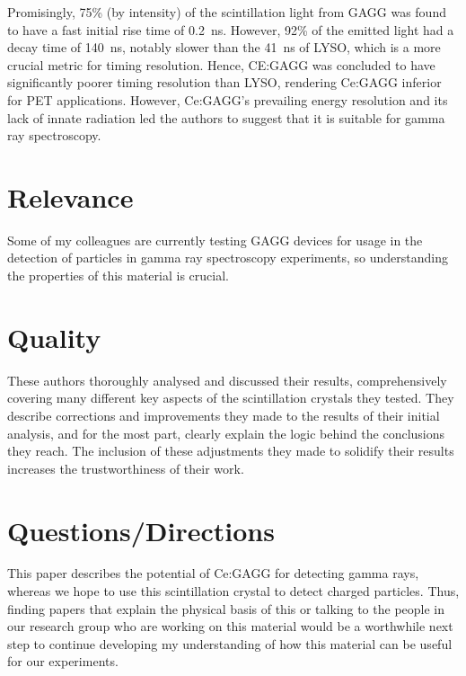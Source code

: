 \documentclass[12pt,a4paper]{article}
\begin{document}
\medskip
Promisingly, 75\% (by intensity) of the scintillation light from GAGG was found to have a fast initial rise time of 0.2~ns. However, 92\% of the emitted light had a decay time of 140~ns, notably slower than the 41~ns of LYSO, which is a more crucial metric for timing resolution. Hence, CE:GAGG was concluded to have significantly poorer timing resolution than LYSO, rendering Ce:GAGG inferior for PET applications. However, Ce:GAGG's prevailing energy resolution and its lack of innate radiation led the authors to suggest that it is suitable for gamma ray spectroscopy. 

\section*{Relevance}
Some of my colleagues are currently testing GAGG devices for usage in the detection of particles in gamma ray spectroscopy experiments, so understanding the properties of this material is crucial. 

\section*{Quality}
These authors thoroughly analysed and discussed their results, comprehensively covering many different key aspects of the scintillation crystals they tested. They describe corrections and improvements they made to the results of their initial analysis, and for the most part, clearly explain the logic behind the conclusions they reach. The inclusion of these adjustments they made to solidify their results increases the trustworthiness of their work.

\section*{Questions/Directions}
This paper describes the potential of Ce:GAGG for detecting gamma rays, whereas we hope to use this scintillation crystal to detect charged particles. Thus, finding papers that explain the physical basis of this or talking to the people in our research group who are working on this material would be a worthwhile next step to continue developing my understanding of how this material can be useful for our experiments.

\vspace*{-\baselineskip}

{}
\end{document}
